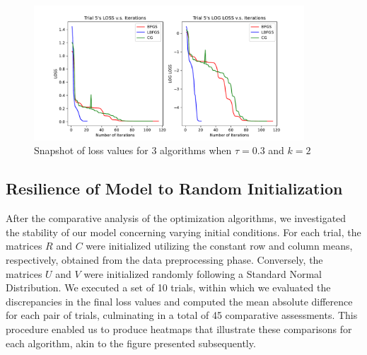 \documentclass{article}
\begin{document}
\begin{figure}[ht]
    \centering
    \includegraphics[width=0.9\textwidth]{lossfigure.pdf}
    \caption{Snapshot of loss values for 3 algorithms when $\tau = 0.3$ and $k = 2$}
    \label{lossfigure_comparison}
\end{figure}
\FloatBarrier


\subsection{Resilience of Model to Random Initialization}
After the comparative analysis of the optimization algorithms, we investigated the stability of our model concerning varying initial conditions. For each trial, the matrices $R$ and $C$ were initialized utilizing the constant row and column means, respectively, obtained from the data preprocessing phase. Conversely, the matrices $U$ and $V$ were initialized randomly following a Standard Normal Distribution. We executed a set of 10 trials, within which we evaluated the discrepancies in the final loss values and computed the mean absolute difference for each pair of trials, culminating in a total of 45 comparative assessments. This procedure enabled us to produce heatmaps that illustrate these comparisons for each algorithm, akin to the figure presented subsequently.
\end{document}
